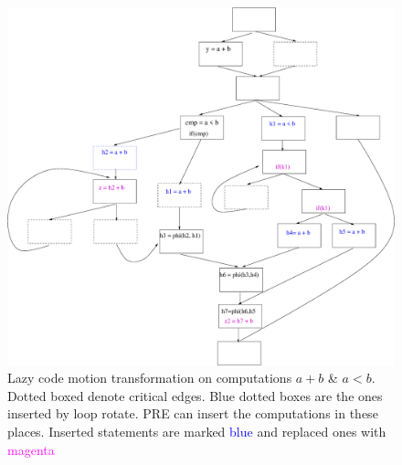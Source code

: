\documentclass[10pt,twoside]{report}
\newcommand{\cmnt}[1]{}
\begin{document}
\begin{figure}[htbp]
  \begin{center}
     \includegraphics[scale=0.4]{2} 
  \end{center}
  \caption{Lazy code motion transformation on computations $a + b$ \& $a < b$.
    Dotted boxed denote critical edges. Blue dotted boxes are the ones inserted by loop
      rotate. PRE can insert the computations in these places. Inserted statements are marked
      \textcolor{blue}{blue} and replaced ones with \textcolor{magenta}{magenta} } 

  \label{fig:2} 
  \end{figure}

\cmnt{    
One point about the insertion
  step is worth mentioning. Suppose that an expression, with value number vn,
       is to be inserted in a basic block. Although our algorithm can handle
         all cases, for simplicity, assume that the insertion point is the end
         of the basic block. To insert the expression we scan the list of the
         expressions in the whole function which have the same value number vn.
         We then clone one of these expressions (called provider) and place at
         the end of the basic block. The trivial case is when the the provider
         is available in the same basic block. If however, the provider comes
         from another basic block, then we need to ensure that the operands of
         the provider dominate the basic block where we wish to insert the
         expression in. Not being able to find a suitable provider is the only
         case where we override the suggestion of the data flow analysis and
         not do PRE for that expression only. PRE for other expressions
         proceeds as usual. Our initial testing suggests that this is a very
         rare occurrence. Fig [] is a motivating example. We would quantify
         this for real applications in our final report.  
}
\end{document}

